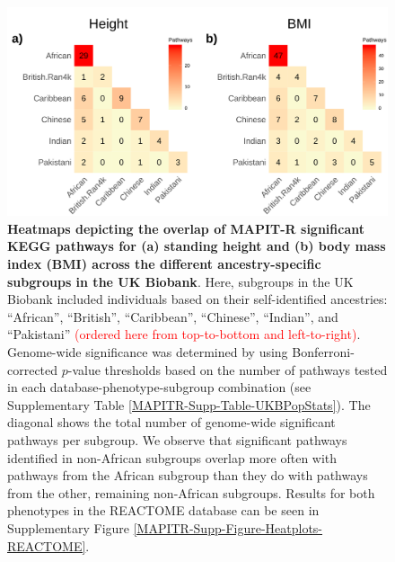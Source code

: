 \documentclass[10pt]{article}
\begin{document}
\begin{figure}[htb]
\centering
\includegraphics[width=\textwidth]{Images/Main/Figure2.png}
\caption{\textbf{Heatmaps depicting the overlap of MAPIT-R significant KEGG pathways for (a) standing height and (b) body mass index (BMI) across the different ancestry-specific subgroups in the UK Biobank}. Here, subgroups in the UK Biobank included individuals based on their self-identified ancestries: ``African'', ``British'', ``Caribbean'', ``Chinese'', ``Indian'', and ``Pakistani'' \textcolor{red}{(ordered here from top-to-bottom and left-to-right)}. Genome-wide significance was determined by using Bonferroni-corrected $p$-value thresholds based on the number of pathways tested in each database-phenotype-subgroup combination (see Supplementary Table \ref{MAPITR-Supp-Table-UKBPopStats}). The diagonal shows the total number of genome-wide significant pathways per subgroup. We observe that significant pathways identified in non-African subgroups overlap more often with pathways from the African subgroup than they do with pathways from the other, remaining non-African subgroups. Results for both phenotypes in the REACTOME database can be seen in Supplementary Figure \ref{MAPITR-Supp-Figure-Heatplots-REACTOME}.}
\label{MAPITR-Main-Figure-Heatplots-KEGG}
\end{figure}

\end{document}
